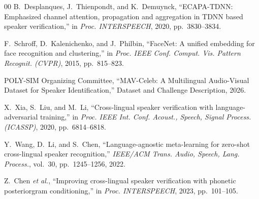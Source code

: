 \documentclass[conference]{IEEEtran}
\begin{document}
\begin{thebibliography}{00}
B.~Desplanques, J.~Thienpondt, and K.~Demuynck,
``ECAPA-TDNN: Emphasized channel attention, propagation and aggregation
in TDNN based speaker verification,''
in \emph{Proc. INTERSPEECH}, 2020, pp.~3830--3834.

F.~Schroff, D.~Kalenichenko, and J.~Philbin,
``FaceNet: A unified embedding for face recognition and clustering,''
in \emph{Proc. IEEE Conf. Comput. Vis. Pattern Recognit. (CVPR)},
2015, pp.~815--823.

POLY-SIM Organizing Committee,
``MAV-Celeb: A Multilingual Audio-Visual Dataset for Speaker Identification,''
Dataset and Challenge Description, 2026.

X.~Xia, S.~Liu, and M.~Li,
``Cross-lingual speaker verification with language-adversarial training,''
in \emph{Proc. IEEE Int. Conf. Acoust., Speech, Signal Process. (ICASSP)},
2020, pp.~6814--6818.

Y.~Wang, D.~Li, and S.~Chen,
``Language-agnostic meta-learning for zero-shot cross-lingual speaker recognition,''
\emph{IEEE/ACM Trans. Audio, Speech, Lang. Process.}, vol.~30, pp.~1245--1256, 2022.

Z.~Chen \emph{et al.},
``Improving cross-lingual speaker verification with phonetic posteriorgram conditioning,''
in \emph{Proc. INTERSPEECH}, 2023, pp.~101--105.

\end{thebibliography}
\end{document}
